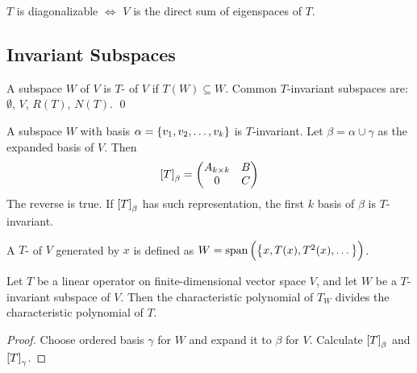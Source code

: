 \begin{theorem}
    $T$ is diagonalizable $\iff$ $V$ is the direct sum of eigenspaces of $T$.
\end{theorem}


\subsection{Invariant Subspaces}

\begin{definition}
    A subspace $W$ of $V$ is $T$- of $V$ if $T(W) \subseteq W$.
    Common $T$-invariant subspaces are: $\emptyset$, $V$, $R(T)$, $N(T)$.
    \qed
\end{definition}

\begin{theorem}
    A subspace $W$ with basis $\alpha = \set{v_1, v_2, \dots, v_k}$ is $T$-invariant. Let $\beta = \alpha \cup \gamma$ as the expanded basis of $V$. Then
    \begin{equation}
        \coordinate{T}_\beta = \begin{pmatrix}
            A_{k \times k} & B \\
            0 & C
        \end{pmatrix}
    \end{equation}
    The reverse is true. If $\coordinate{T}_\beta$  has such representation, the first $k$ basis of $\beta$ is $T$-invariant. 
\end{theorem}



\begin{definition}
    A $T$- of $V$ generated by $x$ is defined as $W=\text{span} \left(  \set{x, T(x), T^2(x), \dots} \right)$.
\end{definition}

\begin{theorem}
    Let $T$ be a linear operator on finite-dimensional vector space $V$, and let $W$ be a $T$-invariant subspace of $V$. Then the characteristic polynomial of $T_W$ divides the characteristic polynomial of $T$.
\end{theorem}

\begin{proof}
    Choose ordered basis $\gamma$ for $W$ and expand it to $\beta$ for $V$. Calculate $\coordinate{T}_\beta$ and $\coordinate{T}_\gamma$.
\end{proof}


